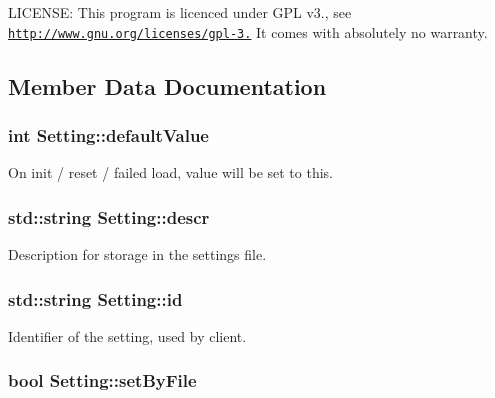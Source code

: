 L\+I\+C\+E\+N\+S\+E\+: This program is licenced under G\+P\+L v3., see \href{http://www.gnu.org/licenses/gpl-3.0}{\tt http\+://www.\+gnu.\+org/licenses/gpl-\/3.} It comes with absolutely no warranty. 

\subsection{Member Data Documentation}
\hypertarget{structSetting_aefa3ae7274f798b1bc25b0ba37b0f4e9}{}
\subsubsection[{default\+Value}]{\setlength{\rightskip}{0pt plus 5cm}int Setting\+::default\+Value}\label{structSetting_aefa3ae7274f798b1bc25b0ba37b0f4e9}


On init / reset / failed load, value will be set to this. 

\hypertarget{structSetting_ae26ca1222bbcbacab256a130037566db}{}
\subsubsection[{descr}]{\setlength{\rightskip}{0pt plus 5cm}std\+::string Setting\+::descr}\label{structSetting_ae26ca1222bbcbacab256a130037566db}


Description for storage in the settings file. 

\hypertarget{structSetting_a399631faac36a18e73a9a2b0a8a5f047}{}
\subsubsection[{id}]{\setlength{\rightskip}{0pt plus 5cm}std\+::string Setting\+::id}\label{structSetting_a399631faac36a18e73a9a2b0a8a5f047}


Identifier of the setting, used by client. 

\hypertarget{structSetting_acac9d129d2c3fd8059a2087878f1b687}{}
\subsubsection[{set\+By\+File}]{\setlength{\rightskip}{0pt plus 5cm}bool Setting\+::set\+By\+File}\label{structSetting_acac9d129d2c3fd8059a2087878f1b687}


